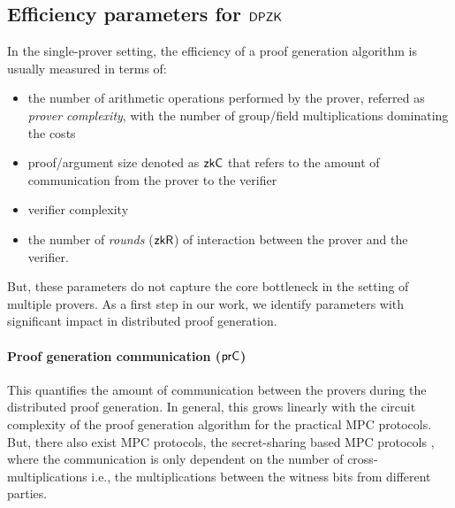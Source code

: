 \subsection{Efficiency parameters for $\mathsf{DPZK}$}
In the single-prover setting, the efficiency of a proof generation algorithm is usually measured in terms of: 
\begin{itemize}
\item the number of arithmetic operations performed by the prover, referred as \textit{prover complexity}, with the number of group/field multiplications dominating the costs
\item proof/argument size denoted as $\mathsf{zkC}$ that refers to the amount of communication from the prover to the verifier
\item verifier complexity
\item the number of \textit{rounds} ($\mathsf{zkR}$) of interaction between the prover and the verifier. %
\end{itemize} 
But, these parameters do not capture the core bottleneck in the setting of multiple provers.  
As a first step in our work, we identify parameters with significant impact in distributed proof generation. 

\paragraph{Proof generation communication ($\mathsf{prC}$)}
This quantifies the amount of communication between the provers during the distributed proof generation. In general, this grows linearly with the circuit complexity of the proof generation algorithm for the practical MPC protocols. 
But, there also exist MPC protocols, the secret-sharing based MPC protocols \cite{GMW87, BGW88, SPDZ}, where the communication is only dependent on the number of cross-multiplications i.e., the multiplications between the witness bits from different parties. %


